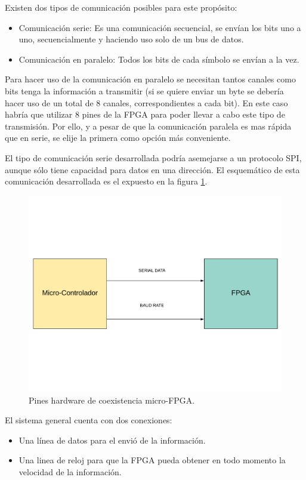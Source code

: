 Existen dos tipos de comunicación posibles para este propósito: 
\begin{itemize}
	\item Comunicación serie: Es una comunicación secuencial, se envían los bits uno a uno, secuencialmente y haciendo uso solo de un bus de datos.
	\item Comunicación en paralelo: Todos los bits de cada símbolo se envían a la vez.
\end{itemize} 

Para hacer uso de la comunicación en paralelo se necesitan tantos canales como bits tenga la información a transmitir (si se quiere enviar un byte se debería hacer uso de un total de 8 canales, correspondientes a cada bit). En este caso habría que utilizar 8 pines de la FPGA para poder llevar a cabo este tipo de transmisión. Por ello, y a pesar de que la comunicación paralela es mas rápida que en serie, se elije la primera como opción más conveniente. \newline

El tipo de comunicación serie desarrollada podría asemejarse a un protocolo SPI, aunque sólo tiene capacidad para datos en una dirección. El esquemático de esta comunicación desarrollada es el expuesto en la figura \ref{fig:coexistencia2}.

\begin{figure}[H]
	\center
	\includegraphics[trim = 0mm 40mm 0mm 20mm, clip,scale=0.4]{imagenes/Balancing_robot/coexistencia2.pdf}
	\caption{Pines hardware de coexistencia micro-FPGA.}
	\label{fig:coexistencia2}
\end{figure}
El sistema general cuenta con dos conexiones:
\begin{itemize}
	\item Una línea de datos para el envió de la información.
	\item Una linea de reloj para que la FPGA pueda obtener en todo momento la velocidad de la información.
\end{itemize}

